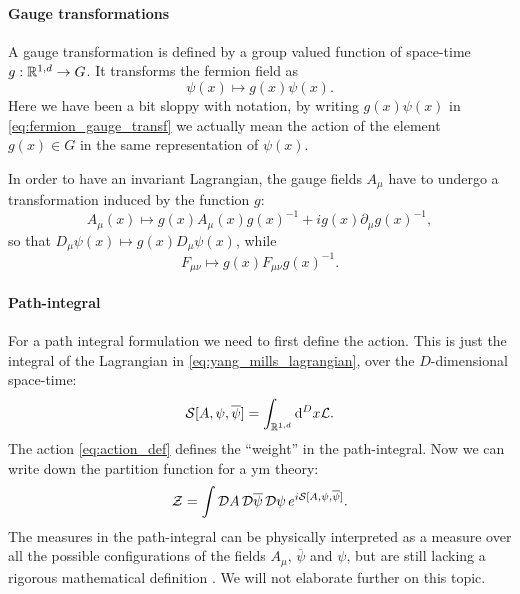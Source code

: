 \paragraph*{Gauge transformations}

A gauge transformation is defined by a group valued function of space-time $g: \mathbb{R}^{1,d} \to G$.
It transforms the fermion field as
\begin{equation}
    \psi(x) \mapsto g(x) \psi(x).
    \label{eq:fermion_gauge_transf}
\end{equation}
Here we have been a bit sloppy with notation, by writing $g(x) \psi(x)$ in \eqref{eq:fermion_gauge_transf} we actually mean the action of the element $g(x) \in G$ in the same representation of $\psi(x)$.

In order to have an invariant Lagrangian, the gauge fields $A_{\mu}$ have to undergo a transformation induced by the function $g$:
\begin{equation}
    A_{\mu}(x) \mapsto g(x) A_{\mu}(x) g(x)^{-1} + i g(x) \partial_{\mu} g(x)^{-1},
\end{equation}
so that $D_{\mu} \psi(x) \mapsto g(x) D_{\mu} \psi(x)$, while
\begin{equation}
    F_{\mu \nu} \mapsto g(x) F_{\mu \nu} g(x)^{-1}.
\end{equation}


\paragraph*{Path-integral}

For a path integral formulation we need to first define the action.
This is just the integral of the Lagrangian in \eqref{eq:yang_mills_lagrangian}, over the $D$-dimensional space-time:
\begin{equation}
    \mathcal{S}[A, \psi, \overline{\psi}] = \int_{\mathbb{R}^{1,d}}  \dd^{D} x \mathcal{L}.
    \label{eq:action_def}
\end{equation}
The action \eqref{eq:action_def} defines the ``weight'' in the path-integral.
Now we can write down the partition function for a \ac{ym} theory:
\begin{equation}
    \mathcal{Z} = \int \mathcal{D} A\, \mathcal{D} \overline{\psi}\, \mathcal{D} \psi \, e^{i \mathcal{S}[A, \psi, \overline{\psi}]}.
    \label{eq:partition_function_mink}
\end{equation}
The measures in the path-integral can be physically interpreted as a measure over all the possible configurations of the fields $A_{\mu}$, $\overline{\psi}$ and $\psi$, but are still lacking a rigorous mathematical definition \cite{peskin1995qft}.
We will not elaborate further on this topic.


